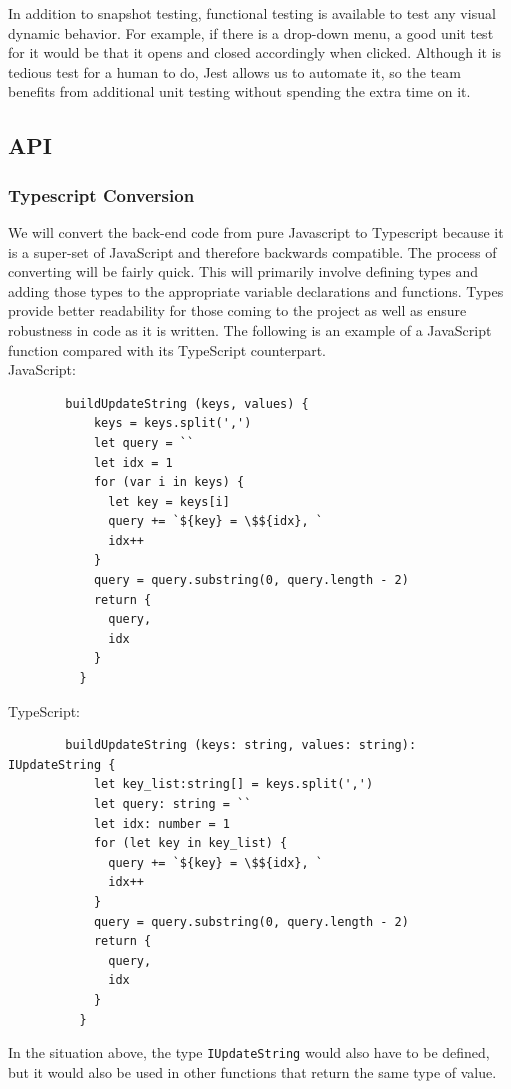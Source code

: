 \documentclass[draftclsnofoot,onecolumn,journal,letterpaper,compsoc,10pt]{IEEEtran}
\begin{document}
    In addition to snapshot testing, functional testing is available to test any visual dynamic behavior. For example, if there is a drop-down menu, a good unit test for it would be that it opens and closed accordingly when clicked. Although it is tedious test for a human to do, Jest allows us to automate it, so the team benefits from additional unit testing without spending the extra time on it.
    
    \subsection{API}
    \subsubsection{Typescript Conversion}
    We will convert the back-end code from pure Javascript to Typescript because it is a super-set of JavaScript and therefore backwards compatible. The process of converting will be fairly quick. This will primarily involve defining types and adding those types to the appropriate variable declarations and functions. Types provide better readability for those coming to the project as well as ensure robustness in code as it is written. The following is an example of a JavaScript function compared with its TypeScript counterpart.\\
    JavaScript:
    \begin{verbatim}
        buildUpdateString (keys, values) {
            keys = keys.split(',')
            let query = ``
            let idx = 1
            for (var i in keys) {
              let key = keys[i]
              query += `${key} = \$${idx}, `
              idx++
            }
            query = query.substring(0, query.length - 2)
            return {
              query,
              idx
            }
          }
    \end{verbatim}
    TypeScript:
    \begin{verbatim}
        buildUpdateString (keys: string, values: string): IUpdateString {
            let key_list:string[] = keys.split(',')
            let query: string = ``
            let idx: number = 1
            for (let key in key_list) {
              query += `${key} = \$${idx}, `
              idx++
            }
            query = query.substring(0, query.length - 2)
            return {
              query,
              idx
            }
          }
        \end{verbatim}
        In the situation above, the type \verb:IUpdateString: would also have to be defined, but it would also be used in other functions that return the same type of value.
\end{document}
